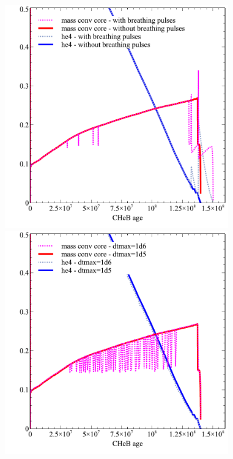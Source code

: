 \documentclass{article}
\begin{document}
        \begin{figure}[H]
          \begin{minipage}[b]{0.5\linewidth}
	    \centering
	    \includegraphics[width = 3.8in]{breathingpulses.pdf}
	    \caption{}
	    \label{fig:1}
          \end{minipage}
          \hspace{0cm}
          \begin{minipage}[b]{0.5\linewidth}
            \centering
            \includegraphics[width = 3.8in]{timestep.pdf}
            \caption{}
            \label{fig:2}
          \end{minipage}
	\end{figure}

        \pagebreak

        
\end{document}
